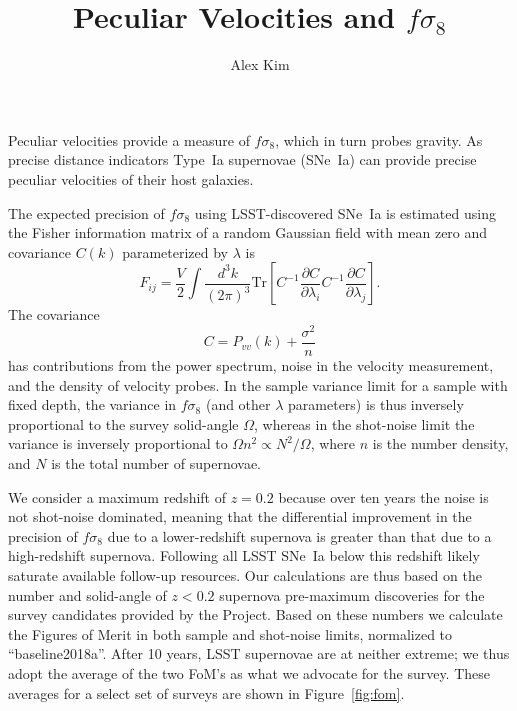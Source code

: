 \documentclass[a4paper,10pt]{article}
\title{Peculiar Velocities and $f\sigma_8$}
\author{Alex Kim}
\date{}
\begin{document}
\maketitle
Peculiar velocities provide a measure of $f\sigma_8$, which in turn probes gravity.  As precise distance indicators Type~Ia supernovae (SNe~Ia)
can provide precise peculiar velocities of their host galaxies.

The  expected precision of $f\sigma_8$ using LSST-discovered SNe~Ia is estimated using
the Fisher information matrix of a random Gaussian field with mean zero and covariance $C(k)$ parameterized by $\lambda$ is
\begin{equation}
F_{ij} = \frac{V}{2}\int \frac{d^3k}{(2\pi)^3} \text{Tr}\left[ C^{-1} \frac{\partial C}{\partial \lambda_i} C^{-1}
\frac{\partial C}{\partial \lambda_j} \right].
\end{equation}
The covariance
\begin{equation}
C = P_{vv}(k) + \frac{\sigma^2}{n}
\end{equation}
has contributions from the power spectrum, noise in the velocity measurement, and the density of velocity probes.
In the sample variance limit for a sample with fixed depth, the variance in $f\sigma_8$ (and other $\lambda$ parameters)
is thus inversely proportional to the survey solid-angle $\Omega$, whereas
in the shot-noise limit the variance is inversely proportional to $\Omega n^2 \propto N^2/\Omega$, where $n$ is the number density,
and $N$ is the total number of supernovae.  

We consider a maximum redshift of $z=0.2$ because over ten years the noise is not shot-noise dominated, meaning that the differential improvement
in the precision of
$f\sigma_8$ due to a lower-redshift supernova is greater than that due to a high-redshift supernova.  Following all LSST SNe~Ia below this redshift 
likely saturate available follow-up resources.
Our calculations are thus based on the number and solid-angle of $z<0.2$ supernova pre-maximum discoveries 
for the survey candidates provided by the Project.  Based on these numbers we calculate the Figures of Merit in
both sample and shot-noise limits, normalized to ``baseline2018a''.
After 10 years,
LSST supernovae are at neither extreme; we thus adopt the average of the two FoM's as what we advocate for the survey.
These averages for a select set of surveys are shown in Figure~\ref{fig:fom}.
\end{document}
